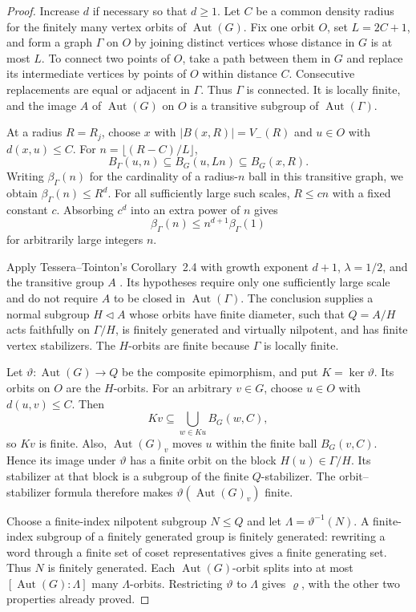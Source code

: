 \begin{proof}
Increase $d$ if necessary so that $d\ge1$. Let $C$ be a common density
radius for the finitely many vertex orbits of $\operatorname{Aut}(G)$. Fix one orbit $O$, set $L=2C+1$, and form a
graph $\Gamma$ on $O$ by joining distinct vertices whose distance in $G$
is at most $L$. To connect two points of $O$, take a path between them
in $G$ and replace its intermediate vertices by points of $O$ within
distance $C$. Consecutive replacements are equal or adjacent in
$\Gamma$. Thus $\Gamma$ is connected. It is locally finite, and the
image $A$ of $\operatorname{Aut}(G)$ on $O$ is a transitive subgroup of
$\operatorname{Aut}(\Gamma)$.

At a radius $R=R_j$, choose $x$ with $|B(x,R)|=V_-(R)$ and $u\in O$
with $d(x,u)\le C$. For $n=\lfloor(R-C)/L\rfloor$,
\[
 B_\Gamma(u,n)\subseteq B_G(u,Ln)\subseteq B_G(x,R).
\]
Writing $\beta_\Gamma(n)$ for the cardinality of a radius-$n$ ball in
this transitive graph, we obtain $\beta_\Gamma(n)\le R^d$.
For all sufficiently large such scales, $R\le c n$ with a fixed
constant $c$. Absorbing $c^d$ into an extra power of $n$ gives
\[
 \beta_\Gamma(n)\le n^{d+1}\beta_\Gamma(1)
\]
for arbitrarily large integers $n$.

Apply Tessera--Tointon's Corollary~2.4 with growth exponent $d+1$,
$\lambda=1/2$, and the transitive group $A$
\cite[Corollary~2.4]{TesseraTointon2021}.
Its hypotheses require only one sufficiently large scale and do not
require $A$ to be closed in $\operatorname{Aut}(\Gamma)$.
The conclusion supplies a normal subgroup $H\lhd A$ whose orbits
have finite diameter, such that $Q=A/H$ acts faithfully on
$\Gamma/H$, is finitely generated and virtually nilpotent, and has
finite vertex stabilizers. The $H$-orbits are finite because $\Gamma$
is locally finite.

Let $\vartheta:\operatorname{Aut}(G)\to Q$ be the composite
epimorphism, and put $K=\ker\vartheta$. Its orbits on $O$ are the
$H$-orbits. For an arbitrary $v\in G$, choose $u\in O$ with
$d(u,v)\le C$. Then
\[
 Kv\subseteq\bigcup_{w\in Ku}B_G(w,C),
\]
so $Kv$ is finite. Also, $\operatorname{Aut}(G)_v$ moves $u$ within
the finite ball $B_G(v,C)$. Hence its image under $\vartheta$ has a
finite orbit on the block $H(u)\in\Gamma/H$. Its stabilizer at that
block is a subgroup of the finite $Q$-stabilizer. The orbit--stabilizer
formula therefore makes $\vartheta(\operatorname{Aut}(G)_v)$ finite.

Choose a finite-index nilpotent subgroup $N\le Q$ and let
$\Lambda=\vartheta^{-1}(N)$. A finite-index subgroup of a finitely
generated group is finitely generated: rewriting a word through a
finite set of coset representatives gives a finite generating set.
Thus $N$ is finitely generated. Each $\operatorname{Aut}(G)$-orbit
splits into at most $[\operatorname{Aut}(G):\Lambda]$ many
$\Lambda$-orbits. Restricting $\vartheta$ to $\Lambda$ gives
$\varrho$, with the other two properties already proved.
\end{proof}

